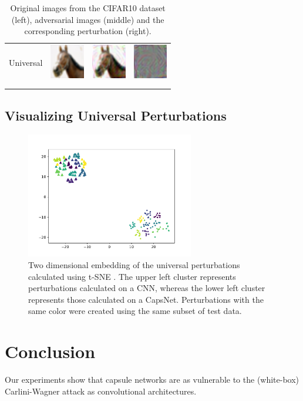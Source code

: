 \documentclass{article}
\begin{document}
\begin{table}[h]
\begin{tabular}{rlll}
	\\
	Universal & \includegraphics[height=1.5cm, align=c]{figures/universal_orig.pdf} & \includegraphics[height=1.5cm, align=c]{figures/universal_adversarial.pdf} & \includegraphics[height=1.5cm, align=c]{figures/universal_diff.pdf}\\
	\\
	\vspace{0.1cm}\\
	\end{tabular}
	\label{tab:images}
	\caption{Original images from the CIFAR10 dataset (left), adversarial images (middle) and the corresponding perturbation (right).}
\end{table}

\subsection{Visualizing Universal Perturbations}

\begin{figure}
	\centering
	\includegraphics[height=5.5cm]{figures/tsne.pdf}
	\caption{Two dimensional embedding of the universal perturbations calculated using t-SNE \cite{tsne}. The upper left cluster represents perturbations calculated on a CNN, whereas the lower left cluster represents those calculated on a CapsNet. Perturbations with the same color were created using the same subset of test data.}
\end{figure}


\FloatBarrier
\section{Conclusion}
Our experiments show that capsule networks are as vulnerable to the (white-box) Carlini-Wagner attack as convolutional architectures.



\end{document}
